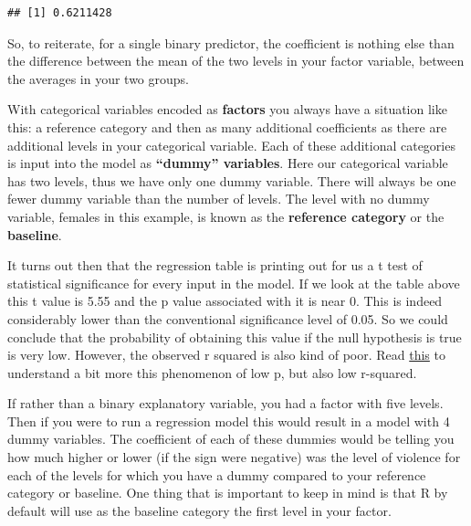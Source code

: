 \documentclass[
]{book}
\newenvironment{Shaded}{\begin{snugshade}}{\end{snugshade}}
\newcommand{\FunctionTok}[1]{\textcolor[rgb]{0.00,0.00,0.00}{#1}}
\newcommand{\NormalTok}[1]{#1}
\newcommand{\SpecialCharTok}[1]{\textcolor[rgb]{0.00,0.00,0.00}{#1}}
\begin{document}
\begin{verbatim}
## [1] 0.6211428
\end{verbatim}

So, to reiterate, for a single binary predictor, the coefficient is nothing else than the difference between the mean of the two levels in your factor variable, between the averages in your two groups.

With categorical variables encoded as \textbf{factors} you always have a situation like this: a reference category and then as many additional coefficients as there are additional levels in your categorical variable. Each of these additional categories is input into the model as \textbf{``dummy'' variables}. Here our categorical variable has two levels, thus we have only one dummy variable. There will always be one fewer dummy variable than the number of levels. The level with no dummy variable, females in this example, is known as the \textbf{reference category} or the \textbf{baseline}.

It turns out then that the regression table is printing out for us a t test of statistical significance for every input in the model. If we look at the table above this t value is 5.55 and the p value associated with it is near 0. This is indeed considerably lower than the conventional significance level of 0.05. So we could conclude that the probability of obtaining this value if the null hypothesis is true is very low. However, the observed r squared is also kind of poor. Read \href{http://blog.minitab.com/blog/adventures-in-statistics/how-to-interpret-a-regression-model-with-low-r-squared-and-low-p-values}{this} to understand a bit more this phenomenon of low p, but also low r-squared.

If rather than a binary explanatory variable, you had a factor with five levels. Then if you were to run a regression model this would result in a model with 4 dummy variables. The coefficient of each of these dummies would be telling you how much higher or lower (if the sign were negative) was the level of violence for each of the levels for which you have a dummy compared to your reference category or baseline. One thing that is important to keep in mind is that R by default will use as the baseline category the first level in your factor.

\begin{Shaded}
\end{Shaded}
\end{document}
